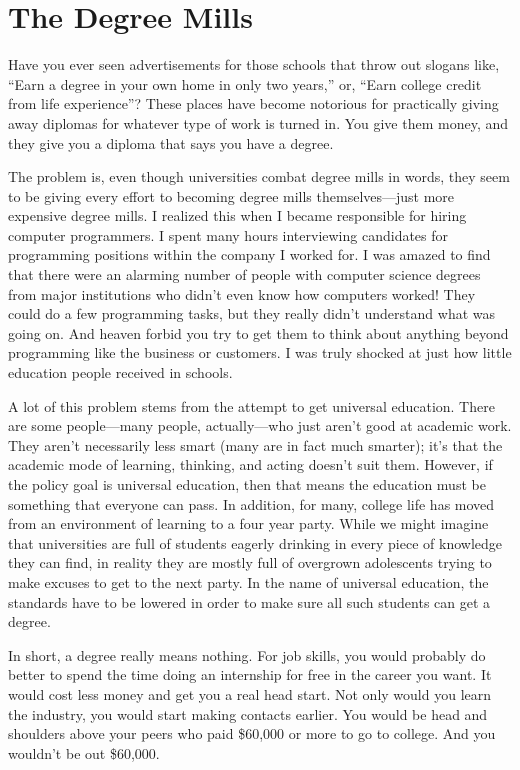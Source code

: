 \section{The Degree Mills}

Have you ever seen advertisements for those
schools that throw out
slogans like, “Earn a degree in your own home in only two years,” or,
“Earn college credit from life experience”?  These places have become
notorious for practically giving away diplomas for whatever type of
work is turned in. You give them money, and they give you a diploma
that says you have a degree.

The problem is, even though universities combat degree mills in words,
they seem to be giving every effort to becoming degree mills
themselves---just more expensive degree mills. I realized this when I
became responsible for hiring computer programmers. I spent many hours
interviewing candidates for programming positions within the company I
worked for. I was amazed to find that there were an alarming number of
people with computer science degrees from major institutions who didn’t
even know how computers worked!  They could do a few programming tasks,
but they really didn’t understand what was going on. And heaven forbid
you try to get them to think about anything beyond programming like the
business or customers. I was truly shocked at just how little education
people received in schools.

A lot of this problem stems from the attempt to get universal education.
There are some people---many people, actually---who just aren’t good at
academic work. They aren’t necessarily less smart (many are in fact
much smarter); it’s that the academic mode of learning,
thinking, and acting doesn’t suit them. However, if the policy goal is
universal education, then that means the education must be something
that everyone can pass. In addition, for many, college life has moved from an
environment of learning to a four year party. While we might
imagine that universities are full of students eagerly drinking in
every piece of knowledge they can find, in
reality they are
mostly full of overgrown adolescents trying to make excuses to get to
the next party. In the name of universal education, the standards have
to be lowered in order to make sure all such students can get a
degree.

In short, a degree really means nothing. For job skills, you would
probably do better to spend the time doing an internship for free in
the career you want. It would cost less money and get you a real head
start. Not only would you learn the industry, you would start making
contacts earlier. You would be head and shoulders above your peers who
paid \$60,000 or more to go to college.  And you
wouldn't be out \$60,000.

